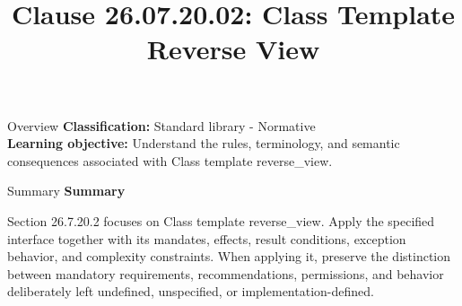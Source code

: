\documentclass[10pt,letterpaper]{article}
\title{Clause 26.07.20.02: Class Template Reverse View}
\author{}
\date{}
\begin{document}
\maketitle
\begin{CornellOverviewBox}{Overview}
\textbf{Classification:} Standard library - Normative\\[2pt]
\textbf{Learning objective:} Understand the rules, terminology, and semantic consequences associated with Class template reverse\_view.
\end{CornellOverviewBox}\begin{CornellSummaryBox}{Summary}
{\sffamily\bfseries\color{Accent} Summary}\par\vspace{3pt}Section 26.7.20.2 focuses on Class template reverse\_view. Apply the specified interface together with its mandates, effects, result conditions, exception behavior, and complexity constraints. When applying it, preserve the distinction between mandatory requirements, recommendations, permissions, and behavior deliberately left undefined, unspecified, or implementation-defined.
\end{CornellSummaryBox}
\end{document}

